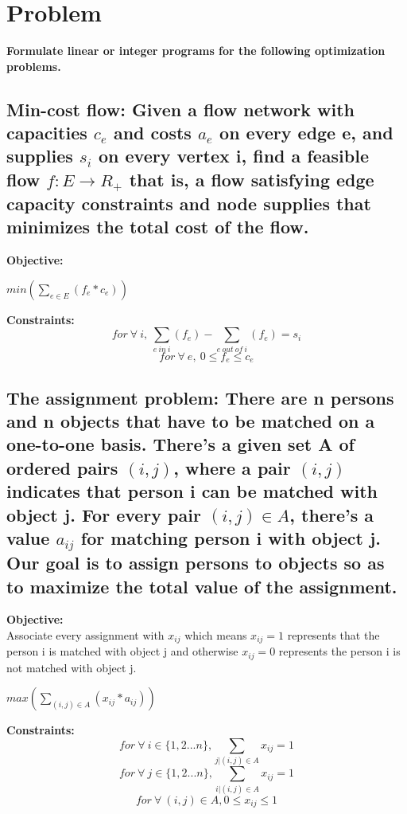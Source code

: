 \documentclass{article}
\begin{document}
\clearpage
\section{Problem \uppercase\expandafter{}}
\textbf{Formulate linear or integer programs for the following optimization problems.}
\subsection{Min-cost flow: Given a flow network with capacities $c_e$ and costs $a_e$ on every edge e, and supplies $s_i$ on every vertex i, find a feasible flow $f : E \rightarrow R_+$ that is, a flow satisfying edge capacity constraints and node supplies that minimizes the total cost of the flow.}
\textbf{Objective:}\\
\centerline{$min(\sum_{e \in E}(f_e*c_e))$}
\textbf{Constraints:}\\
$$for\ \forall\ i,\ \sum_{e\ in\ i}(f_e)-\sum_{e\ out\ of\ i}(f_e) = s_i$$
$$for\ \forall\ e,\ 0\le f_e \le c_e$$
\subsection{The assignment problem: There are n persons and n objects that have to be matched on a one-to-one basis. There's a given set A of ordered pairs $(i, j)$, where a pair $(i, j)$ indicates that person i can be matched with object j. For every pair $(i, j) \in A$, there’s a value $a_{ij}$ for matching person i with object j. Our goal is to assign persons to objects so as to maximize the total value of the assignment.}
\textbf{Objective:}\\
Associate every assignment with $x_{ij}$ which means $x_{ij}=1$ represents that the person i is matched with object j and otherwise $x_{ij}=0$ represents the person i is not matched with object j.\\
\centerline{$max(\sum_{(i,j) \in A}(x_{ij}*a_{ij}))$}
\textbf{Constraints:}\\
$$for\ \forall\ i\in \{1,2...n\}, \sum_{j|(i,j)\in A}x_{ij}=1$$
$$for\ \forall\ j\in \{1,2...n\}, \sum_{i|(i,j)\in A}x_{ij}=1$$
$$for\ \forall\ (i,j) \in A, 0 \le x_{ij}\le 1$$
\end{document}

